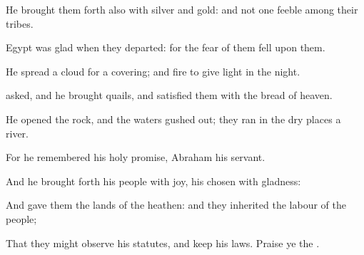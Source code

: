 {\par }{\Q {}He brought them
forth also with
silver and
gold: and
{} not one
feeble
{} among their
tribes.
\par }{\Q {}Egypt was
glad when they
departed: for the
fear of them
fell upon them.
\par }{\Q {}He
spread a
cloud for a
covering; and
fire to give
light in the
night.
\par }{\Q {}
asked, and he
brought
quails, and
satisfied them with the
bread of
heaven.
\par }{\Q {}He
opened the
rock, and the
waters gushed
out; they
ran in the dry
places
{} a
river.
\par }{\Q {}For he
remembered his
holy
promise,
{}
Abraham his
servant.
\par }{\Q {}And he brought
forth his
people with
joy,
{} his
chosen with
gladness:
\par }{\Q {}And
gave them the
lands of the
heathen: and they
inherited the
labour of the
people;
\par }{\Q {}That they might
observe his
statutes, and
keep his
laws.
Praise ye the
{}.

}
